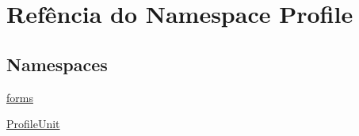 \hypertarget{namespaceProfile}{\section{Refência do Namespace Profile}
\label{namespaceProfile}
}
\subsection*{Namespaces}
\begin{DoxyCompactItemize}
\item 
\hyperlink{namespaceProfile_1_1forms}{forms}
\item 
\hyperlink{namespaceProfile_1_1ProfileUnit}{Profile\-Unit}
\end{DoxyCompactItemize}
